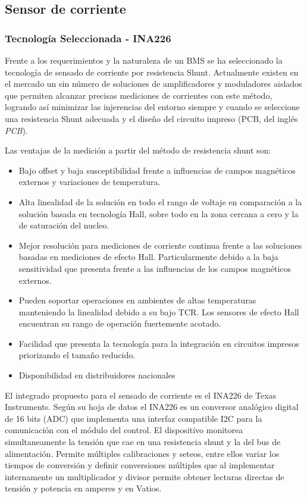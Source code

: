 \documentclass[10pt,a4paper]{article}
\begin{document}
\begin{itemize}
\newpage

\subsection{Sensor de corriente}

\subsubsection{Tecnología Seleccionada - INA226}

Frente a los requerimientos y la naturaleza de un \acrshort{BMS} se ha
seleccionado la tecnología de sensado de corriente por resistencia Shunt.
Actualmente existen en el mercado un sin número de soluciones de amplificadores
y moduladores aislados que permiten alcanzar precisas mediciones de corrientes
con este método, logrando as\'i minimizar las injerencias del entorno siempre 
y cuando se seleccione una resistencia Shunt adecuada y el diseño del circuito
impreso (\acrshort{PCB}, del ingl\'es \emph{\acrlong{PCB}}).

\noindent Las ventajas de la medición a partir del método de resistencia 
shunt son:

\begin{itemize}
    \item Bajo offset y baja susceptibilidad frente a influencias de campos 
	magnéticos externos y variaciones de temperatura.
    \item Alta linealidad de la solución en todo el rango de voltaje en 
	comparación a la solución basada en tecnología Hall, sobre todo en 
	la zona cercana a cero y la de saturación del nucleo. 
    \item Mejor resolución para mediciones de corriente continua frente a 
	las soluciones basadas en mediciones de efecto Hall. 
	Particularmente debido a la baja sensitividad que presenta frente a 
	las influencias de los campos magnéticos externos.
    \item Pueden soportar operaciones en ambientes de altas temperaturas 
	manteniendo la linealidad debido a su bajo TCR. 
	Los sensores de efecto Hall encuentran su rango de operación 
	fuertemente acotado.
    \item Facilidad que presenta la tecnología para la integración en 
	circuitos impresos priorizando el tamaño reducido.
    \item Disponibilidad en distribuidores nacionales
\end{itemize}

\noindent El integrado propuesto para el sensado de corriente es el INA226 de
Texas Instruments. Seg\'un su hoja de datos \cite{ina226} el INA226 es un 
conversor analógico digital de 16 bits (ADC) que implementa una interfaz 
compatible I2C para la comunicación con el módulo del control. El dispositivo 
monitorea simultaneamente la tensión que cae en una resistencia shunt y la del 
bus de alimentación. Permite múltiples calibraciones y seteos, entre ellos 
variar los tiempos de conversión y definir conversiones múltiples que al 
implementar internamente un multiplicador y divisor permite obtener lecturas 
directas de tensión y potencia en amperes y en Vatios.


\end{itemize}
\end{document}
